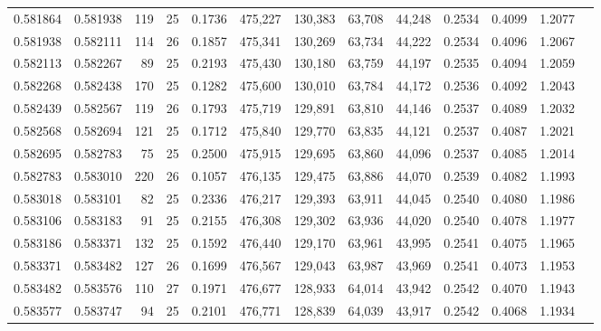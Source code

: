 \begin{tabular}{rrrrrrrrrrrrr}
0.581864 & 0.581938 & 119 &  25 &                                     0.1736 & 475,227 & 130,383 &  63,708 &  44,248 & 0.2534 & 0.4099 & 1.2077 \\
0.581938 & 0.582111 & 114 &  26 &                                     0.1857 & 475,341 & 130,269 &  63,734 &  44,222 & 0.2534 & 0.4096 & 1.2067 \\
0.582113 & 0.582267 &  89 &  25 &                                     0.2193 & 475,430 & 130,180 &  63,759 &  44,197 & 0.2535 & 0.4094 & 1.2059 \\
0.582268 & 0.582438 & 170 &  25 &                                     0.1282 & 475,600 & 130,010 &  63,784 &  44,172 & 0.2536 & 0.4092 & 1.2043 \\
0.582439 & 0.582567 & 119 &  26 &                                     0.1793 & 475,719 & 129,891 &  63,810 &  44,146 & 0.2537 & 0.4089 & 1.2032 \\
0.582568 & 0.582694 & 121 &  25 &                                     0.1712 & 475,840 & 129,770 &  63,835 &  44,121 & 0.2537 & 0.4087 & 1.2021 \\
0.582695 & 0.582783 &  75 &  25 &                                     0.2500 & 475,915 & 129,695 &  63,860 &  44,096 & 0.2537 & 0.4085 & 1.2014 \\
0.582783 & 0.583010 & 220 &  26 &                                     0.1057 & 476,135 & 129,475 &  63,886 &  44,070 & 0.2539 & 0.4082 & 1.1993 \\
0.583018 & 0.583101 &  82 &  25 &                                     0.2336 & 476,217 & 129,393 &  63,911 &  44,045 & 0.2540 & 0.4080 & 1.1986 \\
0.583106 & 0.583183 &  91 &  25 &                                     0.2155 & 476,308 & 129,302 &  63,936 &  44,020 & 0.2540 & 0.4078 & 1.1977 \\
0.583186 & 0.583371 & 132 &  25 &                                     0.1592 & 476,440 & 129,170 &  63,961 &  43,995 & 0.2541 & 0.4075 & 1.1965 \\
0.583371 & 0.583482 & 127 &  26 &                                     0.1699 & 476,567 & 129,043 &  63,987 &  43,969 & 0.2541 & 0.4073 & 1.1953 \\
0.583482 & 0.583576 & 110 &  27 &                                     0.1971 & 476,677 & 128,933 &  64,014 &  43,942 & 0.2542 & 0.4070 & 1.1943 \\
0.583577 & 0.583747 &  94 &  25 &                                     0.2101 & 476,771 & 128,839 &  64,039 &  43,917 & 0.2542 & 0.4068 & 1.1934 \\

\end{tabular}
